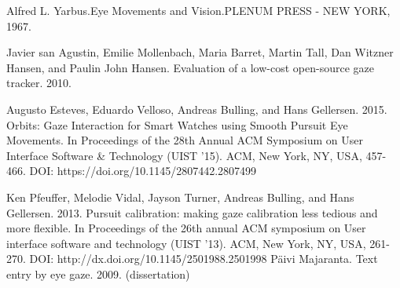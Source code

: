 \documentclass[a4paper, titlepage, 12pt, draft]{article}
\renewcommand{\%}{\scalebox{.9}{\oldpct}}
\begin{document}
\begin{thebibliography}{9}
Alfred L. Yarbus.Eye Movements and Vision.PLENUM PRESS - NEW YORK, 1967.

Javier san Agustin, Emilie Mollenbach, Maria Barret, Martin Tall, Dan Witzner
Hansen, and Paulin John Hansen. Evaluation of a low-cost open-source gaze
tracker. 2010.


Augusto Esteves, Eduardo Velloso, Andreas Bulling, and Hans Gellersen. 2015.
		Orbits: Gaze Interaction for Smart Watches using Smooth Pursuit
		Eye Movements. In Proceedings of the 28th Annual ACM Symposium
		on User Interface Software \& Technology (UIST '15). ACM, New
		York, NY, USA, 457-466. DOI:
		https://doi.org/10.1145/2807442.2807499

Ken Pfeuffer, Melodie Vidal, Jayson Turner, Andreas Bulling, and Hans
Gellersen. 2013. Pursuit calibration: making gaze calibration less tedious and
more flexible. In Proceedings of the 26th annual ACM symposium on User
interface software and technology (UIST '13). ACM, New York, NY, USA, 261-270.
DOI: http://dx.doi.org/10.1145/2501988.2501998
Päivi Majaranta. Text entry by eye gaze. 2009. (dissertation)

\end{thebibliography}
\end{document}
